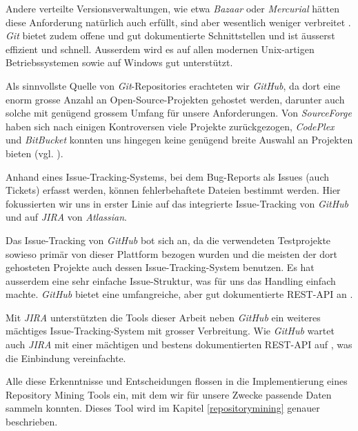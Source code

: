 \documentclass[10pt, a4paper]{article}
\begin{document}
Andere verteilte Versionsverwaltungen, wie etwa \emph{Bazaar} \cite{bazaar} oder \emph{Mercurial} \cite{mercurial} hätten diese Anforderung natürlich auch erfüllt, sind aber wesentlich weniger verbreitet \cite{SOdevSurvey2015}. \emph{Git} bietet zudem offene und gut dokumentierte Schnittstellen und ist äusserst effizient und schnell. Ausserdem wird es auf allen modernen Unix-artigen Betriebssystemen sowie auf Windows gut unterstützt.

Als sinnvollste Quelle von \emph{Git}-Repositories erachteten wir \emph{GitHub}, da dort eine enorm grosse Anzahl an Open-Source-Projekten gehostet werden, darunter auch solche mit genügend grossem Umfang für unsere Anforderungen. Von \emph{SourceForge} haben sich nach einigen Kontroversen \cite{sourceforgesucks1,sourceforgesucks2} viele Projekte zurückgezogen, \emph{CodePlex} und \emph{BitBucket} konnten uns hingegen keine genügend breite Auswahl an Projekten bieten (vgl. \cite{boastatistics}).

Anhand eines Issue-Tracking-Systems, bei dem Bug-Reports als Issues (auch Tickets) erfasst werden, können fehlerbehaftete Dateien bestimmt werden. Hier fokussierten wir uns in erster Linie auf das integrierte Issue-Tracking von \emph{GitHub} und auf \emph{JIRA} von \emph{Atlassian}.

Das Issue-Tracking von \emph{GitHub} bot sich an, da die verwendeten Testprojekte sowieso primär von dieser Plattform bezogen wurden und die meisten der dort gehosteten Projekte auch dessen Issue-Tracking-System benutzen. Es hat ausserdem eine sehr einfache Issue-Struktur, was für uns das Handling einfach machte. \emph{GitHub} bietet eine umfangreiche, aber gut dokumentierte \acs{REST}-\acs{API} an \cite{githubapi}.

Mit \emph{JIRA} unterstützten die Tools dieser Arbeit neben \emph{GitHub} ein weiteres mächtiges Issue-Tracking-System mit grosser Verbreitung. Wie \emph{GitHub} wartet auch \emph{JIRA} mit einer mächtigen und bestens dokumentierten \acs{REST}-\acs{API} auf \cite{jirapi}, was die Einbindung vereinfachte.

Alle diese Erkenntnisse und Entscheidungen flossen in die Implementierung eines Repository Mining Tools ein, mit dem wir für unsere Zwecke passende Daten sammeln konnten. Dieses Tool wird im Kapitel \ref{repositorymining} genauer beschrieben.

\end{document}
